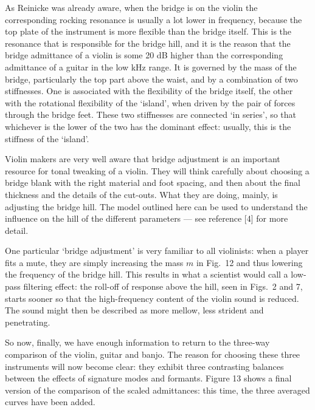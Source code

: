  As Reinicke was already aware, when the bridge is on the violin the 
  corresponding rocking resonance is usually a lot lower in frequency, because 
  the top plate of the instrument is more flexible than the bridge itself. This 
  is the resonance that is responsible for the bridge hill, and it is the 
  reason that the bridge admittance of a violin is some 20 dB higher than the 
  corresponding admittance of a guitar in the low kHz range. It is governed by 
  the mass of the bridge, particularly the top part above the waist, and by a 
  combination of two stiffnesses. One is associated with the flexibility of the 
  bridge itself, the other with the rotational flexibility of the `island', 
  when driven by the pair of forces through the bridge feet. These two 
  stiffnesses are connected `in series', so that whichever is the lower of the 
  two has the dominant effect: usually, this is the stiffness of the `island'. 

  Violin makers are very well aware that bridge adjustment is an important 
  resource for tonal tweaking of a violin. They will think carefully about 
  choosing a bridge blank with the right material and foot spacing, and then 
  about the final thickness and the details of the cut-outs. What they are 
  doing, mainly, is adjusting the bridge hill. The model outlined here can be 
  used to understand the influence on the hill of the different parameters --- 
  see reference [4] for more detail. 

  One particular `bridge adjustment' is very familiar to all violinists: when a 
  player fits a mute, they are simply increasing the mass $m$ in Fig.\ 12 and 
  thus lowering the frequency of the bridge hill. This results in what a 
  scientist would call a low-pass filtering effect: the roll-off of response 
  above the hill, seen in Figs.\ 2 and 7, starts sooner so that the 
  high-frequency content of the violin sound is reduced. The sound might then 
  be described as more mellow, less strident and penetrating. 

  So now, finally, we have enough information to return to the three-way 
  comparison of the violin, guitar and banjo. The reason for choosing these 
  three instruments will now become clear: they exhibit three contrasting 
  balances between the effects of signature modes and formants. Figure 13 shows 
  a final version of the comparison of the scaled admittances: this time, the 
  three averaged curves have been added. 


